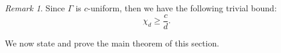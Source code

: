 \documentclass{article}
\theoremstyle{plain}
\theoremstyle{definition}
\newtheorem{definition}[theorem]{Definition}
\theoremstyle{remark}
\newtheorem{remark}[theorem]{Remark}
\begin{document}

\begin{remark}
    Since $\Gamma$ is $c$-uniform, then we
    have the following trivial bound:
    \[
    \chi_d \geq \frac cd.
    \]
\end{remark}
We now state and prove the main theorem of this section.
\end{document}
